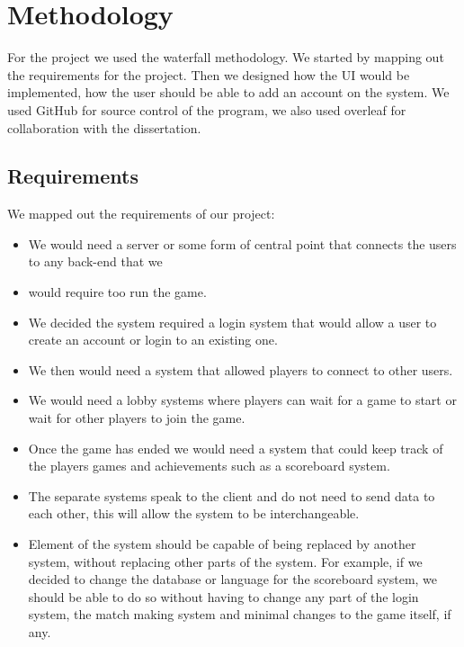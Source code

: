 
\chapter{Methodology}

For the project we used the waterfall methodology. We started by mapping out the requirements for the project. Then we designed how the UI would be implemented, how the user should be able to add an account on the system.  We used GitHub for source control of the program, we also used overleaf for collaboration with the dissertation. 

\section{Requirements}

We mapped out the requirements of our project:
\begin{itemize}
\item We would need a server or some form of central point that connects the users to any back-end that we \item would require too run the game.
\item We decided the system required a login system that would allow a user to create an account or login to an existing one.
\item We then would need a system that allowed players to connect to other users.
\item We would need a lobby systems where players can wait for a game to start or wait for other players to join the game.
\item Once the game has ended we would need a system that could keep track of the players games and achievements such as a scoreboard system.
\item The separate systems speak to the client and do not need to send data to each other, this will allow the system to be interchangeable.
\item Element of the system should be capable of being replaced by another system, without replacing other parts of the system. For example, if we decided to change the database or language for the scoreboard system, we should be able to do so without having to change any part of the login system, the match making system and minimal changes to the game itself, if any.
\end{itemize}


